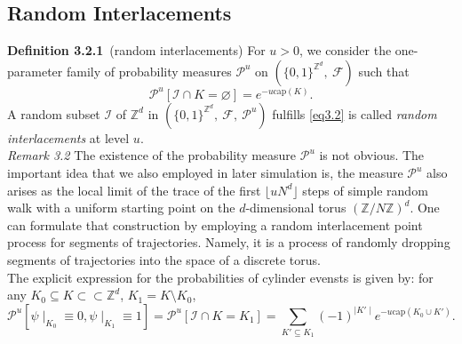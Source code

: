 \documentclass[
11pt, %
a4paper, %
oneside, %
headinclude,footinclude, %
BCOR5mm, %
]{scrartcl}
\begin{document}
\subsection{Random Interlacements}
\textbf{Definition 3.2.1}\ (random interlacements) For $u>0$, we consider the one-parameter family of probability measures $\mathscr{P}^u$ on $(\{0,1\}^{\mathbb{Z}^d}, \ \mathscr{F})$ such that
\begin{equation}
    \label{eq3.2}
    \mathscr{P}^u[\mathscr{I} \cap K=\varnothing]=e^{-u\text{cap}(K)}. \tag{3.2}
\end{equation}
A random subset $\mathscr{I}$ of $\mathbb{Z}^d$ in $(\{0,1\}^{\mathbb{Z}^d}, \ \mathscr{F}, \ \mathscr{P}^u)$ fulfills \eqref{eq3.2} is called \textit{random interlacements} at level $u$.
\vspace{0.6em}\\\textit{Remark 3.2} The existence of the probability measure $\mathscr{P}^u$ is not obvious. The important idea that we also employed in later simulation is, the measure $\mathscr{P}^u$ also arises as the local limit of the trace of the first $\lfloor uN^d \rfloor$ steps of simple random walk with a uniform starting point on the $d$-dimensional torus $(\mathbb{Z}/N\mathbb{Z})^d$. One can formulate that construction by employing a random interlacement point process for segments of trajectories. Namely, it is a process of randomly dropping segments of trajectories into the space of a discrete torus.
\vspace{0.6em}\\The explicit expression for the probabilities of cylinder evensts is given by: for any $K_0 \subseteq K \subset\subset \mathbb{Z}^d$, $K_1=K \setminus K_0$,
\begin{equation}
    \mathscr{P}^u[\psi \mid_{K_0} \equiv 0, \psi \mid_{K_1} \equiv 1]=\mathscr{P}^u[\mathscr{I} \cap K=K_1]=\sum_{K' \subseteq K_1}(-1)^{\mid K' \mid}e^{-u\text{cap}(K_0 \cup K')}. \tag{3.3}
\end{equation}
\end{document}
